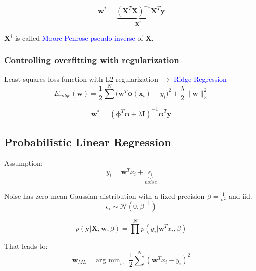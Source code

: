 \documentclass[a4paper,10pt,twoside=true,DIV=10,headsepline,plainheadsepline]{scrartcl}
\begin{document}
			\begin{equation}
				\mathbf{w}^* = \underbrace{(\mathbf{X}^T \mathbf{X})^{-1} \mathbf{X}^T}_{\mathbf{X}^{\dagger}} \mathbf{y}
			\end{equation}

		$\mathbf{X}^{\dagger}$ is called \textcolor{blue}{Moore-Penrose pseudo-inverse} of $\mathbf{X}$.
		\subsubsection{Controlling overfitting with regularization}
			Least squares loss function with L2 regularization $\rightarrow$ \textcolor{blue}{Ridge Regression}
			\begin{equation}
				E_{ridge} (\mathbf{w}) = \frac{1}{2} \sum^N \Big(\mathbf{w}^T \mathbf{\phi}(\mathbf{x}_i) - y_i \Big)^2 + \frac{\lambda}{2} \| \mathbf{w} \|^2_2
			\end{equation}

			\begin{equation}
				\mathbf{w}^* = (\mathbf{\phi}^T \mathbf{\phi} + \lambda \mathbf{I})^{-1} \mathbf{\phi}^T \mathbf{y}
			\end{equation}

		\subsection{Probabilistic Linear Regression}
		
		Assumption:
			\begin{equation}
				y_i = \mathbf{w}^T x_i + \underbrace{\epsilon_i}_{noise}
			\end{equation}

		Noise has zero-mean Gaussian distribution with a fixed precision $\beta = \frac{1}{\sigma^2}$ and iid.
		\begin{equation}
			\epsilon_i \sim \mathcal{N}(0, \beta^{-1})
		\end{equation}

		\begin{equation}
			p(\mathbf{y} | \mathbf{X}, \mathbf{w}, \beta) = \prod^N p(y_i | \mathbf{w}^T x_i, \beta)
		\end{equation}

		That leads to:
		\begin{equation}
			\mathbf{w}_{ML} = \textrm{arg min}_{w} \textrm{ } \frac{1}{2} \sum^N (\mathbf{w}^T x_i - y_i)^2
		\end{equation}
		\newline
\end{document}
